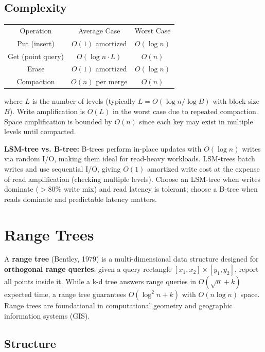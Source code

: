 \subsection{Complexity}

\begin{center}
\begin{tabular}{ccc}
\toprule
Operation & Average Case & Worst Case \\
Put (insert) & $O(1)$ amortized & $O(\log n)$ \\
Get (point query) & $O(\log n \cdot L)$ & $O(n)$ \\
Erase & $O(1)$ amortized & $O(\log n)$ \\
Compaction & $O(n)$ per merge & $O(n)$ \\
\bottomrule
\end{tabular}
\end{center}

where $L$ is the number of levels (typically $L = O(\log n / \log B)$ with block size $B$). Write amplification is $O(L)$ in the worst case due to repeated compaction. Space amplification is bounded by $O(n)$ since each key may exist in multiple levels until compacted.

\textbf{LSM-tree vs. B-tree:} B-trees perform in-place updates with $O(\log n)$ writes via random I/O, making them ideal for read-heavy workloads. LSM-trees batch writes and use sequential I/O, giving $O(1)$ amortized write cost at the expense of read amplification (checking multiple levels). Choose an LSM-tree when writes dominate ($>80\%$ write mix) and read latency is tolerant; choose a B-tree when reads dominate and predictable latency matters.

\section{Range Trees}

A \textbf{range tree} (Bentley, 1979) is a multi-dimensional data structure designed for \textbf{orthogonal range queries}: given a query rectangle $[x_1, x_2] \times [y_1, y_2]$, report all points inside it. While a k-d tree answers range queries in $O(\sqrt{n} + k)$ expected time, a range tree guarantees $O(\log^{2} n + k)$ with $O(n \log n)$ space. Range trees are foundational in computational geometry and geographic information systems (GIS).

\subsection{Structure}

